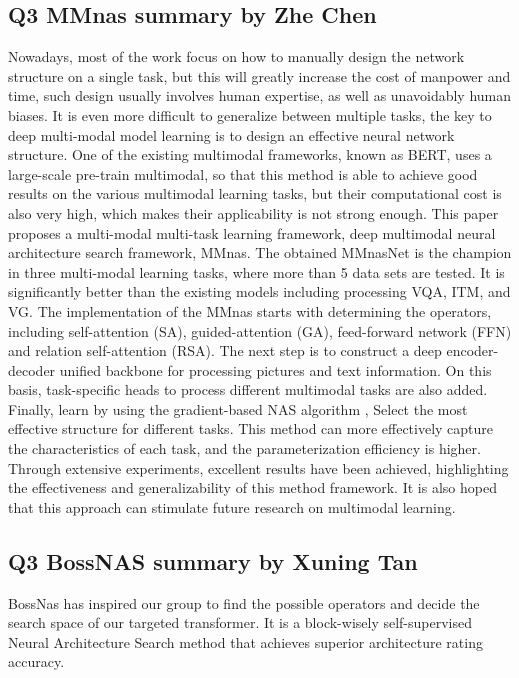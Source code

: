 \documentclass[12pt, a4paper]{article}
\begin{document}
\subsection{Q3 MMnas summary by Zhe Chen}
Nowadays, most of the work focus on how to manually design the network structure on a single task, but this will greatly increase the cost of manpower and time, such design usually involves human expertise, as well as unavoidably human biases. It is even more difficult to generalize between multiple tasks, the key to deep multi-modal model learning is to design an effective neural network structure. One of the existing multimodal frameworks, known as BERT\cite{DBLP:journals/corr/chen2019uniter},  uses a large-scale pre-train multimodal, so that this method is able to achieve good results on the various multimodal learning tasks, but their computational cost is also very high, which makes their applicability is not strong enough. This paper proposes a multi-modal multi-task learning framework, deep multimodal neural architecture search framework, MMnas. The obtained MMnasNet is the champion in three multi-modal learning tasks, where more than 5 data sets are tested. It is significantly better than the existing models including processing VQA, ITM, and VG. The implementation of the MMnas starts with determining the operators, including self-attention (SA), guided-attention (GA), feed-forward network (FFN) and relation self-attention (RSA). The next step is to construct a deep encoder-decoder unified backbone for processing pictures and text information. On this basis, task-specific heads to process different multimodal tasks are also added. Finally, learn by using the gradient-based NAS algorithm , Select the most effective structure for different tasks. This method can more effectively capture the characteristics of each task, and the parameterization efficiency is higher. Through extensive experiments, excellent results have been achieved, highlighting the effectiveness and generalizability of this method framework. It is also hoped that this approach can stimulate future research on multimodal learning.
\subsection{Q3 BossNAS summary by Xuning Tan}
BossNas has inspired our group to find the possible operators and decide the search space of our targeted transformer. It is a block-wisely self-supervised Neural Architecture Search method that achieves superior architecture rating accuracy.\\
\end{document}
